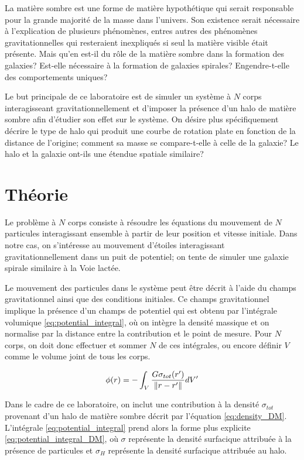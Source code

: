 \documentclass{article}
\begin{document}
La matière sombre est une forme de matière hypothétique qui serait responsable pour la grande majorité de la masse dans l'univers. Son existence serait nécessaire à l'explication de plusieurs phénomènes, entres autres des phénomènes gravitationnelles qui resteraient inexpliqués si seul la matière visible était présente. Mais qu'en est-il du rôle de la matière sombre dans la formation des galaxies? Est-elle nécessaire à la formation de galaxies spirales? Engendre-t-elle des comportements uniques?

Le but principale de ce laboratoire est de simuler un système à $N$ corps interagisseant gravitationnellement et d'imposer la présence d'un halo de matière sombre afin d'étudier son effet sur le système. On désire plus spécifiquement décrire le type de halo qui produit une courbe de rotation plate en fonction de la distance de l'origine; comment sa masse se compare-t-elle à celle de la galaxie? Le halo et la galaxie ont-ils une étendue spatiale similaire? 


\section{Théorie}\label{sec:theorie}

Le problème à $N$ corps consiste à résoudre les équations du mouvement de $N$ particules interagissant ensemble à partir de leur position et vitesse initiale. Dans notre cas, on s'intéresse au mouvement d'étoiles interagissant gravitationnellement dans un puit de potentiel; on tente de simuler une galaxie spirale similaire à la Voie lactée.

Le mouvement des particules dans le système peut être décrit à l'aide du champs gravitationnel ainsi que des conditions initiales. Ce champs gravitationnel implique la présence d'un champs de potentiel qui est obtenu par l'intégrale volumique \ref{eq:potential_integral}, où on intègre la densité massique et on normalise par la distance entre la contribution et le point de mesure. Pour $N$ corps, on doit donc effectuer et sommer $N$ de ces intégrales, ou encore définir $V$ comme le volume joint de tous les corps.

\begin{equation}\label{eq:potential_integral}
	\phi(r) = - \int_{V} \frac{G \sigma_{tot}(r')}{\norm{r-r'}}dV'
\end{equation}

Dans le cadre de ce laboratoire, on inclut une contribution à la densité $\sigma_{tot}$ provenant d'un halo de matière sombre décrit par l'équation \ref{eq:density_DM}. L'intégrale \ref{eq:potential_integral} prend alors la forme plus explicite \ref{eq:potential_integral_DM}, où $\sigma$ représente la densité surfacique attribuée à la présence de particules et $\sigma_H$ représente la densité surfacique attribuée au halo.
\end{document}
